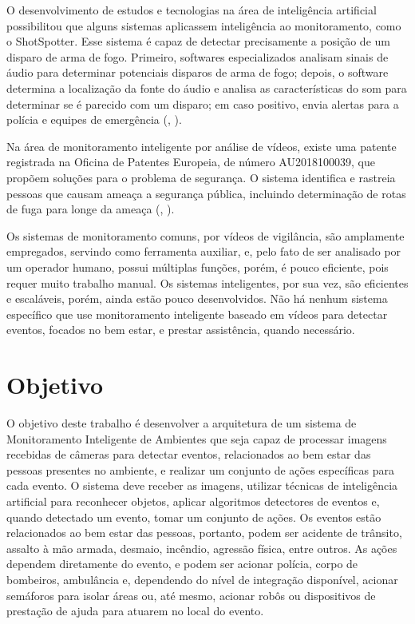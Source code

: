 \documentclass[]{politex}
\begin{document}
O desenvolvimento de estudos e tecnologias na área de inteligência artificial possibilitou que alguns sistemas aplicassem inteligência ao monitoramento, como o ShotSpotter. Esse sistema é capaz de detectar precisamente a posição de um disparo de arma de fogo. Primeiro, softwares especializados analisam sinais de áudio para determinar potenciais disparos de arma de fogo; depois, o software determina a localização da fonte do áudio e analisa as características do som para determinar se é parecido com um disparo; em caso positivo, envia alertas para a polícia e equipes de emergência (, \citeyear{shotspooter}).

Na área de monitoramento inteligente por análise de vídeos, existe uma patente registrada na Oficina de Patentes Europeia, de número AU2018100039, que propõem soluções para o problema de segurança. O sistema identifica e rastreia pessoas que causam ameaça a segurança pública, incluindo determinação de rotas de fuga para longe da ameaça (, \citeyear{patente}).

Os sistemas de monitoramento comuns, por vídeos de vigilância, são amplamente empregados, servindo como ferramenta auxiliar, e, pelo fato de ser analisado por um operador humano, possui múltiplas funções, porém, é pouco eficiente, pois requer muito trabalho manual. Os sistemas inteligentes, por sua vez, são eficientes e escaláveis, porém, ainda estão pouco desenvolvidos. Não há nenhum sistema específico que use monitoramento inteligente baseado em vídeos para detectar eventos, focados no bem estar, e prestar assistência, quando necessário.

\section{Objetivo}
O objetivo deste trabalho é desenvolver a arquitetura de um sistema de Monitoramento Inteligente de Ambientes que seja capaz de processar imagens recebidas de câmeras para detectar eventos, relacionados ao bem estar das pessoas presentes no ambiente, e realizar um conjunto de ações específicas para cada evento. O sistema deve receber as imagens, utilizar técnicas de inteligência artificial para reconhecer objetos, aplicar algoritmos detectores de eventos e, quando detectado um evento, tomar um conjunto de ações. Os eventos estão relacionados ao bem estar das pessoas, portanto, podem ser acidente de trânsito, assalto à mão armada, desmaio, incêndio, agressão física, entre outros. As ações dependem diretamente do evento, e podem ser acionar polícia, corpo de bombeiros, ambulância e, dependendo do nível de integração disponível, acionar semáforos para isolar áreas ou, até mesmo, acionar robôs ou dispositivos de prestação de ajuda para atuarem no local do evento.
\end{document}

